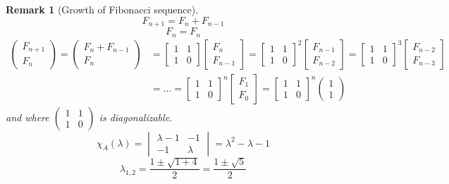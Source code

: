 \documentclass{article}
\newtheorem{remark}{Remark}  \numberwithin{remark}{section}
\newcommand{\vectwo}[2]{\begin{pmatrix} #1 \\ #2 \end{pmatrix}}
\begin{document}
\begin{remark}[Growth of Fibonacci sequence]
  \[ F_{n+1} = F_n + F_{n-1} \]
  \[ F_n = F_n \]
  \begin{align*}
    \vectwo{F_{n+1}}{F_n}
      = \vectwo{F_n + F_{n-1}}{F_n}
      &= \begin{bmatrix} 1 & 1 \\ 1 & 0 \end{bmatrix} \begin{bmatrix} F_n \\ F_{n-1} \end{bmatrix} 
      = \begin{bmatrix} 1 & 1 \\ 1 & 0 \end{bmatrix}^2 \begin{bmatrix} F_{n-1} \\ F_{n-2} \end{bmatrix} 
      = \begin{bmatrix} 1 & 1 \\ 1 & 0 \end{bmatrix}^3 \begin{bmatrix} F_{n-2} \\ F_{n-3} \end{bmatrix} \\
      &= \dots
      = \begin{bmatrix} 1 & 1 \\ 1 & 0 \end{bmatrix}^n \begin{bmatrix} F_1 \\ F_0 \end{bmatrix}
      = \begin{bmatrix} 1 & 1 \\ 1 & 0 \end{bmatrix}^n \vectwo11
  \end{align*}
  and where $\begin{pmatrix} 1 & 1 \\ 1 & 0 \end{pmatrix}$ is diagonalizable.
  \[
    \chi_A(\lambda) = \begin{vmatrix}
      \lambda-1 & -1 \\
      -1 & \lambda
    \end{vmatrix} = \lambda^2 - \lambda - 1
  \] \[
    \lambda_{1,2} = \frac{1 \pm \sqrt{1 + 4}}{2} = \frac{1 \pm \sqrt{5}}{2}
  \]


\end{remark}
\end{document}
